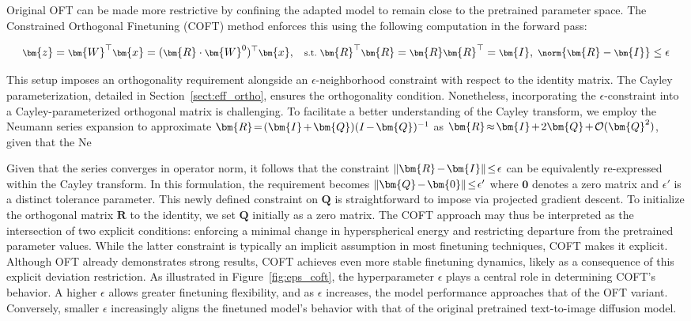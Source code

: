Original OFT can be made more restrictive by confining the adapted model to remain close to the pretrained parameter space. The Constrained Orthogonal Finetuning (COFT) method enforces this using the following computation in the forward pass:

\begin{equation}\label{eq:coft_general}
    \footnotesize
    \bm{z}=\bm{W}^\top\bm{x}=(\bm{R}\cdot\bm{W}^0)^\top\bm{x},~~~\text{s.t.}~\bm{R}^\top\bm{R}=\bm{R}\bm{R}^\top=\bm{I},~\norm{\bm{R}-\bm{I}}\leq \epsilon
\end{equation}

This setup imposes an orthogonality requirement alongside an $\epsilon$-neighborhood constraint with respect to the identity matrix. The Cayley parameterization, detailed in Section~\ref{sect:eff_ortho}, ensures the orthogonality condition. Nonetheless, incorporating the $\epsilon$-constraint into a Cayley-parameterized orthogonal matrix is challenging. To facilitate a better understanding of the Cayley transform, we employ the Neumann series expansion to approximate $\thickmuskip=2mu \medmuskip=2mu \bm{R} = (\bm{I} + \bm{Q})(I-\bm{Q})^{-1}$ as $\thickmuskip=2mu \medmuskip=2mu \bm{R}\approx\bm{I}+2\bm{Q}+\mathcal{O}(\bm{Q}^2)$, given that the Ne

Given that the series converges in operator norm, it follows that the constraint $\thickmuskip=2mu \medmuskip=2mu\|\bm{R}-\bm{I}\|\leq\epsilon$ can be equivalently re-expressed within the Cayley transform. In this formulation, the requirement becomes $\thickmuskip=2mu \medmuskip=2mu \|\bm{Q}-\bm{0}\|\leq\epsilon'$ where $\bm{0}$ denotes a zero matrix and $\epsilon'$ is a distinct tolerance parameter. This newly defined constraint on $\bm{Q}$ is straightforward to impose via projected gradient descent. To initialize the orthogonal matrix $\bm{R}$ to the identity, we set $\bm{Q}$ initially as a zero matrix. The COFT approach may thus be interpreted as the intersection of two explicit conditions: enforcing a minimal change in hyperspherical energy and restricting departure from the pretrained parameter values. While the latter constraint is typically an implicit assumption in most finetuning techniques, COFT makes it explicit. Although OFT already demonstrates strong results, COFT achieves even more stable finetuning dynamics, likely as a consequence of this explicit deviation restriction. As illustrated in Figure~\ref{fig:eps_coft}, the hyperparameter $\epsilon$ plays a central role in determining COFT's behavior. A higher $\epsilon$ allows greater finetuning flexibility, and as $\epsilon$ increases, the model performance approaches that of the OFT variant. Conversely, smaller $\epsilon$ increasingly aligns the finetuned model's behavior with that of the original pretrained text-to-image diffusion model.

